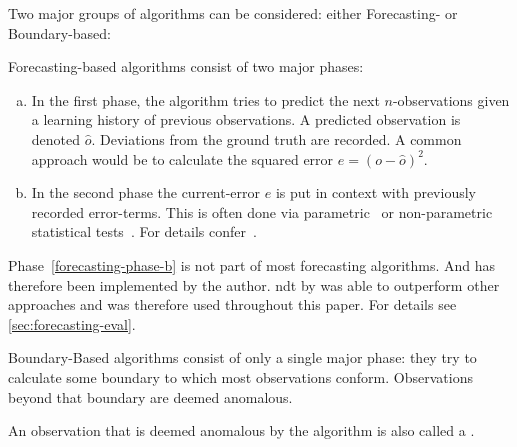 Two major groups of algorithms can be considered: either Forecasting- or
Boundary-based:
\begin{definition}\label{def:forecasting-based-algo}
    Forecasting-based algorithms consist of two major phases:
    \begin{enumerate}[a.)]
        \item In the first phase, the algorithm tries to predict the next \(n\)-observations
        given a learning history of previous observations. A predicted observation
        is denoted \(\hat{o}\). Deviations from the ground truth are recorded.
        A common approach would be to calculate the squared error \(e = {\left(o - \hat{o}\right)}^2\).
        \item In the second phase the current-error \(e\) is put in context with
        previously recorded error-terms. This is often done via 
        parametric~\cite{Malhotra.2015,Ahmad.2017,Guo.2016,Malhotra.2016,Shipmon.2017,Chauhan.2015} or 
        non-parametric statistical tests~\cite{Zhu.2017,Hundman.2018,Maimo.2018,Su.2019}.
        For details confer~\cite{Zietlow.2020}.\label{forecasting-phase-b}
    \end{enumerate}
    Phase~\ref{forecasting-phase-b} is not part of most forecasting algorithms.
    And has therefore been implemented by the author. \acrfull{ndt}
    by \textcite{Hundman.2018} was able to outperform other approaches and was
    therefore used throughout this paper. For details see \cref{sec:forecasting-eval}.
\end{definition}

\begin{definition}\label{def:boundary-based-algo}
    Boundary-Based algorithms consist of only a single major phase:
    they try to calculate some boundary to which most observations conform.
    Observations beyond that boundary are deemed anomalous.
\end{definition}

\begin{definition}[Detection]\label{def:detection}
    An observation that is deemed anomalous by the algorithm is also called a
    .
\end{definition}
